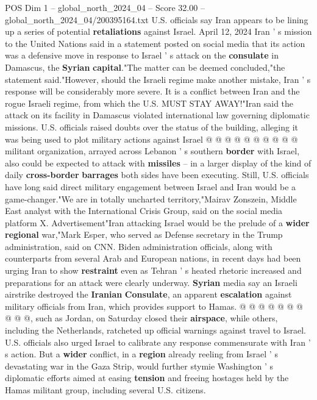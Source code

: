 \begin{textsample}{POS Dim 1 – global\_north\_2024\_04 – Score 32.00 – global\_north\_2024\_04/200395164.txt}
U.S. officials say Iran appears to be lining up a series of potential \textbf{retaliations} against Israel.
April 12, 2024 Iran ' s mission to the United Nations said in a statement posted on social media that its action was a defensive move in response to Israel ' s attack on the \textbf{consulate} in Damascus, the \textbf{Syrian} \textbf{capital}."The matter can be deemed concluded,"the statement said."However, should the Israeli regime make another mistake, Iran ' s response will be considerably more severe.
It is a conflict between Iran and the rogue Israeli regime, from which the U.S.
MUST STAY AWAY!"Iran said the attack on its facility in Damascus violated international law governing diplomatic missions.
U.S. officials raised doubts over the status of the building, alleging it was being used to plot military actions against Israel @ @ @ @ @ @ @ @ @ @ militant organization, arrayed across Lebanon ' s southern \textbf{border} with Israel, also could be expected to attack with \textbf{missiles} -- in a larger display of the kind of daily \textbf{cross-border} \textbf{barrages} both sides have been executing.
Still, U.S. officials have long said direct military engagement between Israel and Iran would be a game-changer."We are in totally uncharted territory,"Mairav Zonszein, Middle East analyst with the International Crisis Group, said on the social media platform X.
Advertisement"Iran attacking Israel would be the prelude of a \textbf{wider} \textbf{regional} war,"Mark Esper, who served as Defense secretary in the Trump administration, said on CNN.
Biden administration officials, along with counterparts from several Arab and European nations, in recent days had been urging Iran to show \textbf{restraint} even as Tehran ' s heated rhetoric increased and preparations for an attack were clearly underway. \textbf{Syrian} media say an Israeli airstrike destroyed the \textbf{Iranian} \textbf{Consulate}, an apparent \textbf{escalation} against military officials from Iran, which provides support to Hamas. @ @ @ @ @ @ @ @ @ @, such as Jordan, on Saturday closed their \textbf{airspace}, while others, including the Netherlands, ratcheted up official warnings against travel to Israel.
U.S. officials also urged Israel to calibrate any response commensurate with Iran ' s action.
But a \textbf{wider} conflict, in a \textbf{region} already reeling from Israel ' s devastating war in the Gaza Strip, would further stymie Washington ' s diplomatic efforts aimed at easing \textbf{tension} and freeing hostages held by the Hamas militant group, including several U.S. citizens.

\end{textsample}
